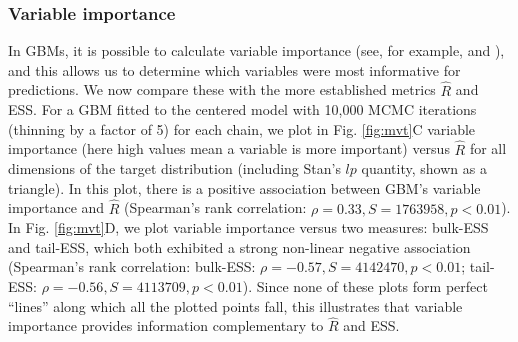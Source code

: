 \documentclass{article}
\begin{document}
\subsubsection{Variable importance}\label{sec:multivariate_normal_varimportance}
In GBMs, it is possible to calculate variable importance (see, for example, \cite{friedman2001greedy} and \cite{greenwell2019package}), and this allows us to determine which variables were most informative for predictions. We now compare these with the more established metrics $\widehat{R}$ and ESS. For a GBM fitted to the centered model with 10,000 MCMC iterations (thinning by a factor of 5) for each chain, we plot in Fig. \ref{fig:mvt}C variable importance (here high values mean a variable is more important) versus $\widehat{R}$ for all dimensions of the target distribution (including Stan's $lp$ quantity, shown as a triangle). In this plot, there is a positive association between GBM's variable importance and $\widehat{R}$ (Spearman's rank correlation: $\rho=0.33, S=1763958, p<0.01$). In Fig.  \ref{fig:mvt}D, we plot variable importance versus two measures: bulk-ESS and tail-ESS, which both exhibited a strong non-linear negative association (Spearman's rank correlation: bulk-ESS: $\rho=-0.57, S=4142470, p<0.01$; tail-ESS: $\rho=-0.56, S=4113709, p<0.01$). Since none of these plots form perfect ``lines'' along which all the plotted points fall, this illustrates that variable importance provides information complementary to $\widehat{R}$ and ESS.
\end{document}
